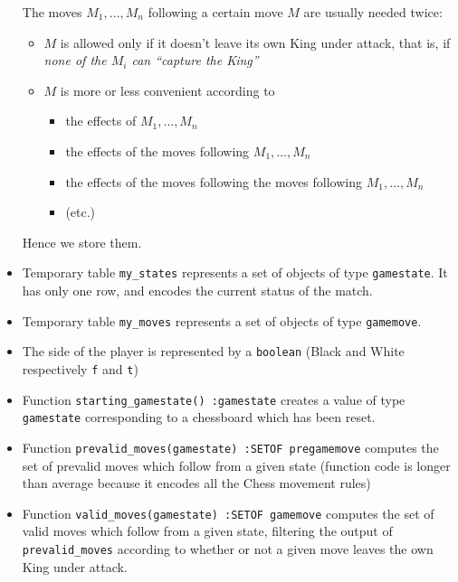 \begin{itemize}
  \begin{rem} The moves $M_1,\dots,M_n$ following a certain move $M$
    are usually needed twice:
    \begin{itemize}
    \item $M$ is allowed only if it doesn't leave its own King under
      attack, that is, if \emph{none of the $M_i$ can ``capture the
        King''}
    \item $M$ is more or less convenient according to
      \begin{itemize}
      \item the effects of $M_1,\dots,M_n$
      \item the effects of the moves following $M_1,\dots,M_n$
      \item the effects of the moves following the moves following
        $M_1,\dots,M_n$
      \item (etc.)
      \end{itemize}
    \end{itemize}
    Hence we store them.
  \end{rem}

\item Temporary table \verb+my_states+ represents a set of objects of
  type \verb+gamestate+. It has only one row, and encodes the current
  status of the match.

\item Temporary table \verb+my_moves+ represents a set of objects of
  type \verb+gamemove+.

\item The side of the player is represented by a \verb+boolean+ (Black
  and White respectively \verb+f+ and \verb+t+)

\item Function \verb+starting_gamestate() :gamestate+ creates a value
  of type \verb+gamestate+ corresponding to a chessboard which has
  been reset.

\item Function \verb+prevalid_moves(gamestate) :SETOF pregamemove+
  computes the set of prevalid moves which follow from a given state
  (function code is longer than average because it encodes all the
  Chess movement rules)

\item Function \verb+valid_moves(gamestate) :SETOF gamemove+ computes
  the set of valid moves which follow from a given state, filtering
  the output of \verb+prevalid_moves+ according to whether or not a
  given move leaves the own King under attack.


\end{itemize}
